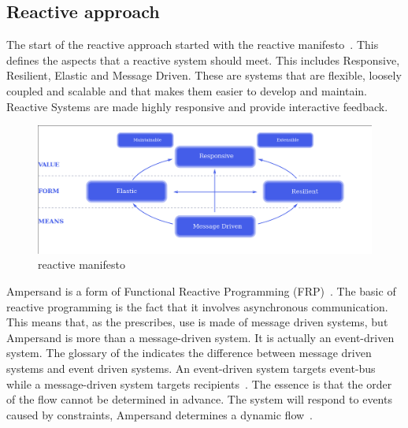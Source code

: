 \subsection{Reactive approach} \label{reactive_approach}

The start of the reactive approach started with the reactive manifesto~.
This defines the aspects that a reactive system should meet.
This includes Responsive, Resilient, Elastic and Message Driven.
These are systems that are flexible, loosely coupled and scalable and that makes them easier to develop and maintain.
Reactive Systems are made highly responsive and provide interactive feedback.
\begin{figure}[H] 
\includegraphics[scale=0.3]{00_common/04_images/reactive manifesto.png}
\centering
\caption{reactive manifesto}
\label{fig:reactive manifesto}
\end{figure}


Ampersand is a form of Functional Reactive Programming (FRP)~\citep{elliott_functional_1997}.
The basic of reactive programming is the fact that it involves asynchronous communication.
This means that, as the  prescribes, use is made of message driven systems, but Ampersand is more than a message-driven system.
It is actually an event-driven system.
The glossary of the  indicates the difference between message driven systems and event driven systems.
An event-driven system targets event-bus while a message-driven system targets recipients~\citep{bainomugisha_survey_2013}.
The essence is that the order of the flow cannot be determined in advance.
The system will respond to events caused by constraints, Ampersand determines a dynamic flow~\citep{joosten_relation_2018}.




